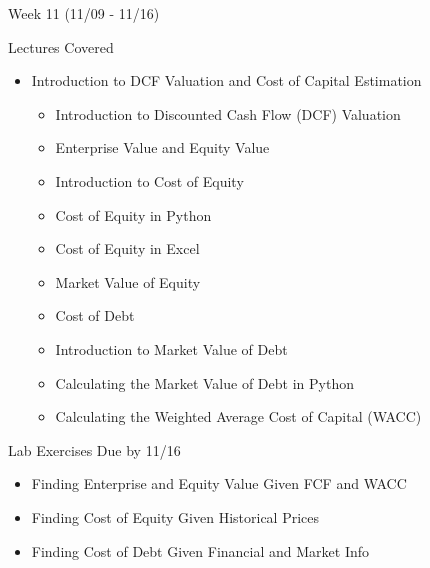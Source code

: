 \documentclass[]{article}
\begin{document}
\begin{section}{Week 11 (11/09 - 11/16)}
\begin{subsection}{Lectures Covered}
\begin{itemize}
\item Introduction to DCF Valuation and Cost of Capital Estimation
\begin{itemize}
\item Introduction to Discounted Cash Flow (DCF) Valuation
\item Enterprise Value and Equity Value
\item Introduction to Cost of Equity
\item Cost of Equity in Python
\item Cost of Equity in Excel
\item Market Value of Equity
\item Cost of Debt
\item Introduction to Market Value of Debt
\item Calculating the Market Value of Debt in Python
\item Calculating the Weighted Average Cost of Capital (WACC)
\end{itemize}
\end{itemize}
\end{subsection}
\begin{subsection}{Lab Exercises Due by 11/16}
\begin{itemize}
\item Finding Enterprise and Equity Value Given FCF and WACC
\item Finding Cost of Equity Given Historical Prices
\item Finding Cost of Debt Given Financial and Market Info
\end{itemize}
\end{subsection}
\end{section}
\end{document}
